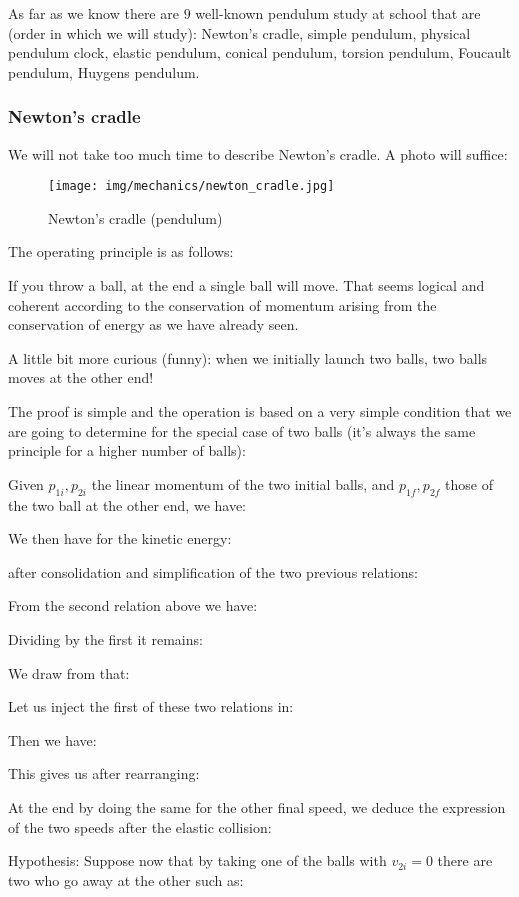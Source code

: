 	As far as we know there are $9$ well-known pendulum study at school that are (order in which we will study): Newton's cradle, simple pendulum, physical pendulum clock, elastic pendulum, conical pendulum, torsion pendulum, Foucault pendulum, Huygens pendulum.
	
	\subsubsection{Newton's cradle}
	We will not take too much time to describe Newton's cradle. A photo will suffice:
	\begin{figure}[H]
		\centering
		\texttt{[image: img/mechanics/newton\_cradle.jpg]}
		\caption{Newton's cradle (pendulum)}
	\end{figure}
	The operating principle is as follows:

	If you throw a ball, at the end a single ball will move. That seems logical and coherent according to the conservation of momentum arising from the conservation of energy as we have already seen.

	A little bit more curious (funny): when we initially launch two balls, two balls moves at the other end!

	The proof is simple and the operation is based on a very simple condition that we are going to determine for the special case of two balls (it's always the same principle for  a higher number of balls):

	Given $p_{1i},p_{2i}$ the linear momentum of the two initial balls, and $p_{1f},p_{2f}$ those of the two ball at the other end, we have:
	
	We then have for the kinetic energy:
	
	after consolidation and simplification of the two previous relations:
	
	From the second relation above we have:
	
	Dividing by the first it remains:
	
	We draw from that:
	
	Let us inject the first of these two relations in:
	
	Then we have:
	
	This gives us after rearranging:
	
	At the end by doing the same for the other final speed, we deduce the expression of the two speeds after the elastic collision:
	
	Hypothesis: Suppose now that by taking one of the balls with $v_{2i}=0$ there are two who go away at the other such as:
	

